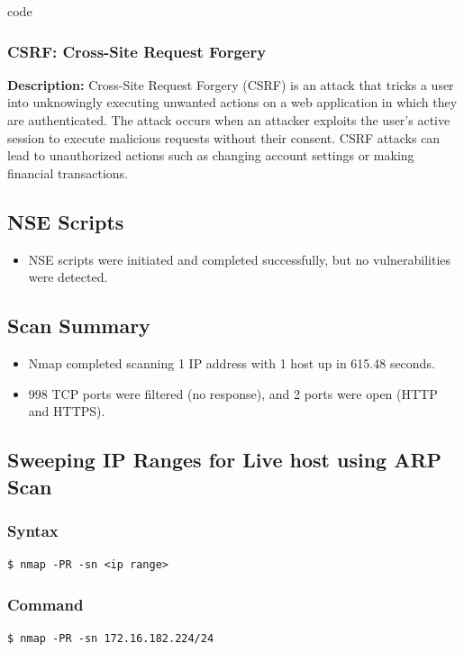code \documentclass[11pt]{article}
\begin{document}
\subsubsection*{CSRF: Cross-Site Request Forgery}

\textbf{Description:} Cross-Site Request Forgery (CSRF) is an attack that tricks a user into unknowingly executing unwanted actions on a web application in which they are authenticated. The attack occurs when an attacker exploits the user's active session to execute malicious requests without their consent. CSRF attacks can lead to unauthorized actions such as changing account settings or making financial transactions.

\subsection*{NSE Scripts}
\begin{itemize}
    \item NSE scripts were initiated and completed successfully, but no vulnerabilities were detected.
\end{itemize}

\subsection*{Scan Summary}
\begin{itemize}
    \item Nmap completed scanning 1 IP address with 1 host up in 615.48 seconds.
    \item 998 TCP ports were filtered (no response), and 2 ports were open (HTTP and HTTPS).
\end{itemize}



\subsection{Sweeping IP Ranges for Live host using ARP Scan}

\subsubsection{Syntax}
\begin{verbatim}
$ nmap -PR -sn <ip range>
\end{verbatim}

\subsubsection*{Command}
\begin{verbatim}
$ nmap -PR -sn 172.16.182.224/24
\end{verbatim}
\end{document}
